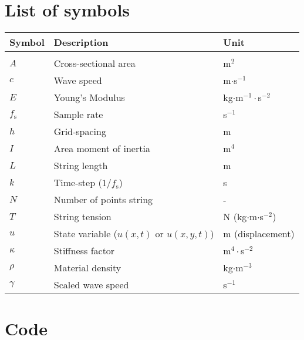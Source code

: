 \documentclass{article}
\begin{document}
\appendix
\section{List of symbols} \label{app:A}
{\renewcommand{\arraystretch}{1.1}
\begin{tabular}{ p{3cm} p{7cm} p{4cm}  }
 Symbol & Description & Unit\\
 \hline\\
 $A$ & Cross-sectional area & m$^2$\\
 $c$ & Wave speed & m$\cdot$s$^{-1}$\\
 $E$ & Young's Modulus & kg$\cdot$m$^{-1}\cdot$s$^{-2}$\\
 $f_\text{s}$ & Sample rate & s$^{-1}$\\
 $h$ & Grid-spacing & m \\ 
 $I$ & Area moment of inertia \cite{Desv2017} & m$^4$\\
 $L$ & String length & m\\
 $k$ & Time-step ($1/f_\text{s}$) & s\\
 $N$ & Number of points string & -\\
 $T$ & String tension & N (kg$\cdot$m$\cdot$s$^{-2}$) \\
 $u$ & State variable ($u(x,t)\text{ or }u(x,y,t)$) & m (displacement)\\ 
 $\kappa$ & Stiffness factor & m$^4\cdot$s$^{-2}$\\
 $\rho$ & Material density & kg$\cdot$m$^{-3}$\\
 $\gamma$ & Scaled wave speed & s$^{-1}$\\
\end{tabular}
}
\section{Code}



\end{document}

